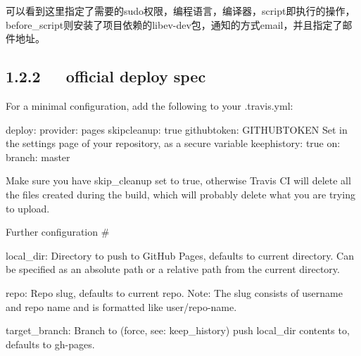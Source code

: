 \documentclass[letterpaper,12pt,english]{sphinxmanual}
\begin{document}
\begin{sphinxVerbatim}[commandchars=\\\{\}]
 
 
 
    
 
       
     
     
\end{sphinxVerbatim}

可以看到这里指定了需要的sudo权限，编程语言，编译器，script即执行的操作，before\_script则安装了项目依赖的libev-dev包，通知的方式email，并且指定了邮件地址。


\subsection{1.2.2   official deploy spec}
\label{\detokenize{001software/001install/001._u7f51_u7ad9/travisCI:official-deploy-spec}}
For a minimal configuration, add the following to your .travis.yml:

\begin{sphinxVerbatim}[commandchars=\\\{\}]
deploy:
  provider: pages
  skip\PYGZus{}cleanup: true
  github\PYGZus{}token: \PYGZdl{}GITHUB\PYGZus{}TOKEN  \PYGZsh{} Set in the settings page of your repository,    as a secure variable
  keep\PYGZus{}history: true
  on:
    branch: master
\end{sphinxVerbatim}

Make sure you have skip\_cleanup set to true, otherwise Travis CI will delete all the files created during the build, which will probably delete what you are trying to upload.

Further configuration \#

local\_dir: Directory to push to GitHub Pages, defaults to current directory. Can be specified as an absolute path or a relative path from the current directory.

repo: Repo slug, defaults to current repo. Note: The slug consists of username and repo name and is formatted like user/repo-name.

target\_branch: Branch to (force, see: keep\_history) push local\_dir contents to, defaults to gh-pages.
\end{document}
